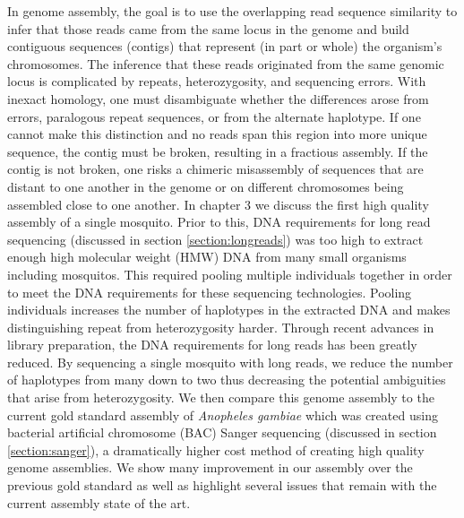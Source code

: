 \par{
In genome assembly, the goal is to use the overlapping read sequence similarity to infer that those reads came from the same locus in the genome and build contiguous sequences (contigs) that represent (in part or whole) the organism's chromosomes. The inference that these reads originated from the same genomic locus is complicated by repeats, heterozygosity, and sequencing errors. With inexact homology, one must disambiguate whether the differences arose from errors, paralogous repeat sequences, or from the alternate haplotype. If one cannot make this distinction and no reads span this region into more unique sequence, the contig must be broken, resulting in a fractious assembly. If the contig is not broken, one risks a chimeric misassembly of sequences that are distant to one another in the genome or on different chromosomes being assembled close to one another. In chapter 3 we discuss the first high quality assembly of a single mosquito. Prior to this, DNA requirements for long read sequencing (discussed in section \ref{section:longreads}) was too high to extract enough high molecular weight (HMW) DNA from many small organisms including mosquitos. This required pooling multiple individuals together in order to meet the DNA requirements for these sequencing technologies. Pooling individuals increases the number of haplotypes in the extracted DNA and makes distinguishing repeat from heterozygosity harder. Through recent advances in library preparation, the DNA requirements for long reads has been greatly reduced. By sequencing a single mosquito with long reads, we reduce the number of haplotypes from many down to two thus decreasing the potential ambiguities that arise from heterozygosity. We then compare this genome assembly to the current gold standard assembly of \textit{Anopheles gambiae} which was created using bacterial artificial chromosome (BAC) Sanger sequencing (discussed in section \ref{section:sanger}), a dramatically higher cost method of creating high quality genome assemblies. We show many improvement in our assembly over the previous gold standard as well as highlight several issues that remain with the current assembly state of the art.
} 



